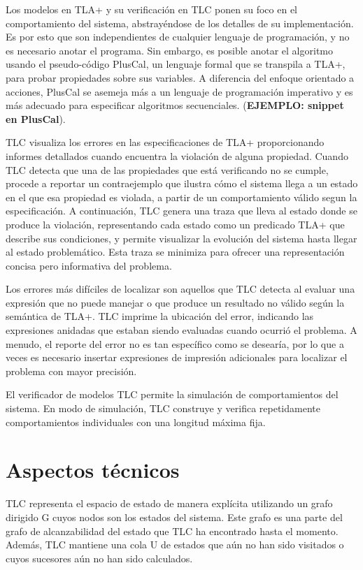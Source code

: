 \documentclass[runningheads]{llncs}
\begin{document}
Los modelos en TLA+ y su verificación en TLC ponen su foco en el comportamiento del sistema, abstrayéndose de los detalles de su implementación. Es por esto que son independientes de cualquier lenguaje de programación, y no es necesario anotar el programa. Sin embargo, es posible anotar el algoritmo usando el pseudo-código PlusCal, un lenguaje formal que se transpila a TLA+, para probar propiedades sobre sus variables. A diferencia del enfoque orientado a acciones, PlusCal se asemeja más a un lenguaje de programación imperativo y es más adecuado para especificar algoritmos secuenciales. (\textbf{EJEMPLO: snippet en PlusCal}).

TLC visualiza los errores en las especificaciones de TLA+ proporcionando informes detallados cuando encuentra la violación de alguna propiedad. Cuando TLC detecta que una de las propiedades que está verificando no se cumple, procede a reportar un contraejemplo que ilustra cómo el sistema llega a un estado en el que esa propiedad es violada, a partir de un comportamiento válido segun la especificación. A continuación, TLC genera una traza que lleva al estado donde se produce la violación, representando cada estado como un predicado TLA+ que describe sus condiciones, y permite visualizar la evolución del sistema hasta llegar al estado problemático. Esta traza se minimiza para ofrecer una representación concisa pero informativa del problema. 

Los errores más difíciles de localizar son aquellos que TLC detecta al evaluar una expresión que no puede manejar o que produce un resultado no válido según la semántica de TLA+. TLC imprime la ubicación del error, indicando las expresiones anidadas que estaban siendo evaluadas cuando ocurrió el problema. A menudo, el reporte del error no es tan específico como se desearía, por lo que a veces es necesario insertar expresiones de impresión adicionales para localizar el problema con mayor precisión.

El verificador de modelos TLC permite la simulación de comportamientos del sistema. En modo de simulación, TLC construye y verifica repetidamente comportamientos individuales con una longitud máxima fija.

\section{Aspectos técnicos}
TLC representa el espacio de estado de manera explícita utilizando un grafo dirigido G cuyos nodos son los estados del sistema. Este grafo es una parte del grafo de alcanzabilidad del estado que TLC ha encontrado hasta el momento. Además, TLC mantiene una cola U de estados que aún no han sido visitados o cuyos sucesores aún no han sido calculados.
\end{document}

